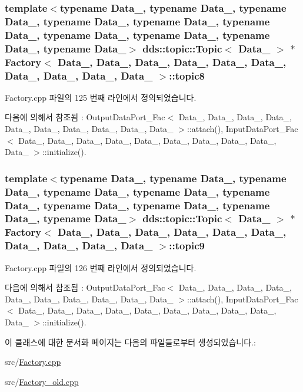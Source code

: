 \subsubsection[{\texorpdfstring{topic8}{topic8}}]{\setlength{\rightskip}{0pt plus 5cm}template$<$typename Data\+\_, typename Data\+\_, typename Data\+\_, typename Data\+\_, typename Data\+\_, typename Data\+\_, typename Data\+\_, typename Data\+\_, typename Data\+\_, typename Data\+\_$>$ dds\+::topic\+::\+Topic$<$ Data\+\_ $>$ $\ast$ {\bf Factory}$<$ Data\+\_, Data\+\_, Data\+\_, Data\+\_, Data\+\_, Data\+\_, Data\+\_, Data\+\_, Data\+\_, Data\+\_ $>$\+::topic8}\hypertarget{classFactory_a9357b99e6b5b07bb4115b854010873fd}{}\label{classFactory_a9357b99e6b5b07bb4115b854010873fd}


Factory.\+cpp 파일의 125 번째 라인에서 정의되었습니다.



다음에 의해서 참조됨 \+:  Output\+Data\+Port\+\_\+\+Fac$<$ Data\+\_, Data\+\_, Data\+\_, Data\+\_, Data\+\_, Data\+\_, Data\+\_, Data\+\_, Data\+\_, Data\+\_ $>$\+::attach(), Input\+Data\+Port\+\_\+\+Fac$<$ Data\+\_, Data\+\_, Data\+\_, Data\+\_, Data\+\_, Data\+\_, Data\+\_, Data\+\_, Data\+\_, Data\+\_ $>$\+::initialize().

\subsubsection[{\texorpdfstring{topic9}{topic9}}]{\setlength{\rightskip}{0pt plus 5cm}template$<$typename Data\+\_, typename Data\+\_, typename Data\+\_, typename Data\+\_, typename Data\+\_, typename Data\+\_, typename Data\+\_, typename Data\+\_, typename Data\+\_, typename Data\+\_$>$ dds\+::topic\+::\+Topic$<$ Data\+\_ $>$ $\ast$ {\bf Factory}$<$ Data\+\_, Data\+\_, Data\+\_, Data\+\_, Data\+\_, Data\+\_, Data\+\_, Data\+\_, Data\+\_, Data\+\_ $>$\+::topic9}\hypertarget{classFactory_a6f4d710cdaab90dc87a0fff6cd3a34bc}{}\label{classFactory_a6f4d710cdaab90dc87a0fff6cd3a34bc}


Factory.\+cpp 파일의 126 번째 라인에서 정의되었습니다.



다음에 의해서 참조됨 \+:  Output\+Data\+Port\+\_\+\+Fac$<$ Data\+\_, Data\+\_, Data\+\_, Data\+\_, Data\+\_, Data\+\_, Data\+\_, Data\+\_, Data\+\_, Data\+\_ $>$\+::attach(), Input\+Data\+Port\+\_\+\+Fac$<$ Data\+\_, Data\+\_, Data\+\_, Data\+\_, Data\+\_, Data\+\_, Data\+\_, Data\+\_, Data\+\_, Data\+\_ $>$\+::initialize().



이 클래스에 대한 문서화 페이지는 다음의 파일들로부터 생성되었습니다.\+:\begin{DoxyCompactItemize}
\item 
src/\hyperlink{Factory_8cpp}{Factory.\+cpp}\item 
src/\hyperlink{Factory__old_8cpp}{Factory\+\_\+old.\+cpp}\end{DoxyCompactItemize}
